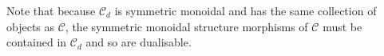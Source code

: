 \documentclass[11pt,letterpaper]{article}
\theoremstyle{plain}
\theoremstyle{definition}
\newtheorem{definition}[theorem]{Definition}
\newtheorem{remark}[theorem]{Remark}
\newcommand{\C}{\mathscr{C}}
\newcommand{\op}{\mathrm{op}}
\newcommand{\todo}[1]{\textcolor{red}{\small #1}}
\begin{document}


Note that because $\C_d$ is symmetric monoidal and has the same collection of objects as $\C$, the symmetric monoidal structure morphisms of $\C$ must be contained in $\C_d$ and so are dualisable.
\end{document}
